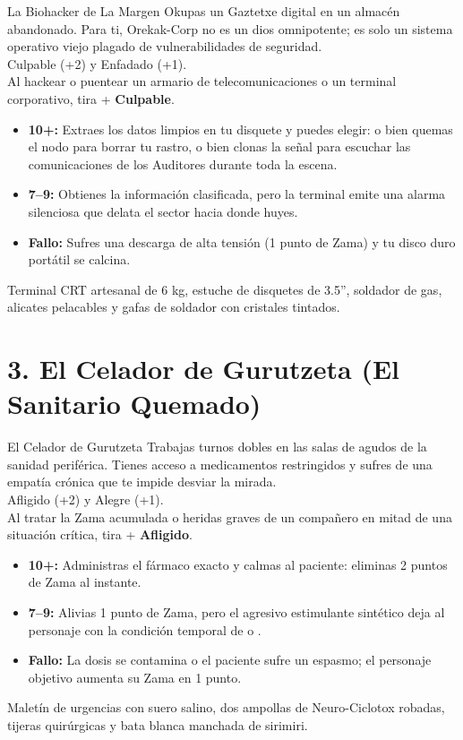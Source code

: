\begin{FichaArquetipo}{La Biohacker de La Margen}
Okupas un Gaztetxe digital en un almacén abandonado. Para ti, Orekak-Corp no es un dios omnipotente; es solo un sistema operativo viejo plagado de vulnerabilidades de seguridad.\\
 Culpable (+2) y Enfadado (+1).\\
 Al hackear o puentear un armario de telecomunicaciones o un terminal corporativo, tira + \textbf{Culpable}.
\begin{itemize}
  \item \textbf{10+:} Extraes los datos limpios en tu disquete y puedes elegir: o bien quemas el nodo para borrar tu rastro, o bien clonas la señal para escuchar las comunicaciones de los Auditores durante toda la escena.
  \item \textbf{7--9:} Obtienes la información clasificada, pero la terminal emite una alarma silenciosa que delata el sector hacia donde huyes.
  \item \textbf{Fallo:} Sufres una descarga de alta tensión (1 punto de Zama) y tu disco duro portátil se calcina.
\end{itemize}
 Terminal CRT artesanal de 6 kg, estuche de disquetes de 3.5'', soldador de gas, alicates pelacables y gafas de soldador con cristales tintados.
\end{FichaArquetipo}

\section{3. El Celador de Gurutzeta (El Sanitario Quemado)}

\begin{FichaArquetipo}{El Celador de Gurutzeta}
Trabajas turnos dobles en las salas de agudos de la sanidad periférica. Tienes acceso a medicamentos restringidos y sufres de una empatía crónica que te impide desviar la mirada.\\
 Afligido (+2) y Alegre (+1).\\
 Al tratar la Zama acumulada o heridas graves de un compañero en mitad de una situación crítica, tira + \textbf{Afligido}.
\begin{itemize}
  \item \textbf{10+:} Administras el fármaco exacto y calmas al paciente: eliminas 2 puntos de Zama al instante.
  \item \textbf{7--9:} Alivias 1 punto de Zama, pero el agresivo estimulante sintético deja al personaje con la condición temporal de  o .
  \item \textbf{Fallo:} La dosis se contamina o el paciente sufre un espasmo; el personaje objetivo aumenta su Zama en 1 punto.
\end{itemize}
 Maletín de urgencias con suero salino, dos ampollas de Neuro-Ciclotox robadas, tijeras quirúrgicas y bata blanca manchada de sirimiri.
\end{FichaArquetipo}

